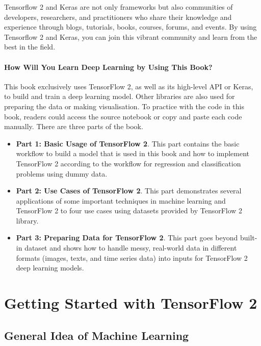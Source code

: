 \documentclass[
  letterpaper,
  DIV=11,
  numbers=noendperiod]{scrreprt}
\providecommand{\tightlist}{%
  \setlength{\itemsep}{0pt}\setlength{\parskip}{0pt}}\usepackage{longtable,booktabs,array}
\begin{document}
Tensorflow 2 and Keras are not only frameworks but also communities of
developers, researchers, and practitioners who share their knowledge and
experience through blogs, tutorials, books, courses, forums, and events.
By using Tensorflow 2 and Keras, you can join this vibrant community and
learn from the best in the field.

\hypertarget{how-will-you-learn-deep-learning-by-using-this-book}{%
\subsection*{How Will You Learn Deep Learning by Using This
Book?}\label{how-will-you-learn-deep-learning-by-using-this-book}}

This book exclusively uses TensorFlow 2, as well as its high-level API
or Keras, to build and train a deep learning model. Other libraries are
also used for preparing the data or making visualisation. To practice
with the code in this book, readers could access the source notebook or
copy and paste each code manually. There are three parts of the book.

\begin{itemize}
\tightlist
\item
  \textbf{Part 1: Basic Usage of TensorFlow 2}. This part contains the
  basic workflow to build a model that is used in this book and how to
  implement TensorFlow 2 according to the workflow for regression and
  classification problems using dummy data.
\item
  \textbf{Part 2: Use Cases of TensorFlow 2}. This part demonstrates
  several applications of some important techniques in machine learning
  and TensorFlow 2 to four use cases using datasets provided by
  TensorFlow 2 library.
\item
  \textbf{Part 3: Preparing Data for TensorFlow 2}. This part goes
  beyond built-in dataset and shows how to handle messy, real-world data
  in different formats (images, texts, and time series data) into inputs
  for TensorFlow 2 deep learning models.
\end{itemize}

\part{{Getting Started with TensorFlow 2}}

\hypertarget{general-idea-of-machine-learning}{%
\chapter{General Idea of Machine
Learning}\label{general-idea-of-machine-learning}}
\end{document}
